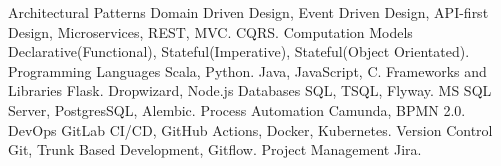   \begin{cvskills}
    \cvskill
      {Architectural Patterns} 
      { Domain Driven Design, Event Driven Design, API-first Design, Microservices, REST, MVC.}
    \cvskill
      {} 
      {  CQRS.}
    \cvskill
      {Computation Models} 
      { Declarative(Functional), Stateful(Imperative), Stateful(Object Orientated).} 
    \cvskill
      {Programming Languages} 
      { Scala, Python.}
    \cvskill
      {} 
      {  Java, JavaScript, C.}
    \cvskill
      {Frameworks and Libraries} 
      { Flask.}
    \cvskill
      {} 
      { Dropwizard, Node.js}
    \cvskill
      {Databases} 
      { SQL, TSQL, Flyway.}
    \cvskill
      {} 
      {  MS SQL Server, PostgresSQL, Alembic.}
    \cvskill
      {Process Automation}
      { Camunda, BPMN 2.0.}
    \cvskill
      {DevOps} 
      { GitLab CI/CD, GitHub Actions, Docker, Kubernetes.} 
    \cvskill
      {Version Control} 
      { Git, Trunk Based Development, Gitflow.} 
    \cvskill
      {Project Management} 
      { Jira.} 
  \end{cvskills}